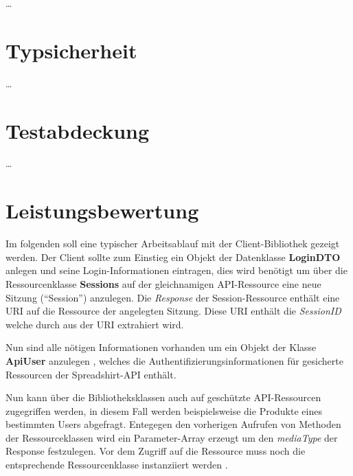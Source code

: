\ldots

\section{Typsicherheit}
\label{sec:type_safety}

\ldots

\section{Testabdeckung}
\label{sec:test_coverage}

\ldots

\section{Leistungsbewertung}
\label{sec:performance_measurement}


Im folgenden soll eine typischer Arbeitsablauf mit der Client-Bibliothek gezeigt werden. Der Client sollte zum Einstieg ein Objekt der Datenklasse \textbf{LoginDTO} anlegen  und seine Login-Informationen eintragen, dies wird benötigt um über die Ressourcenklasse \textbf{Sessions} auf der gleichnamigen \gls{API}-Ressource eine neue Sitzung (\enquote{Session}) anzulegen.
Die \emph{Response} der Session-Ressource enthält eine \gls{URI} auf die Ressource der angelegten Sitzung. Diese \gls{URI} enthält die \emph{SessionID} welche durch  aus der \gls{URI} extrahiert wird.

Nun sind alle nötigen Informationen vorhanden um ein Objekt der Klasse \textbf{ApiUser} anzulegen , welches die Authentifizierungsinformationen für gesicherte Ressourcen der Spreadshirt-\gls{API} enthält.

Nun kann über die Bibliotheksklassen auch auf geschützte \gls{API}-Ressourcen zugegriffen werden, in diesem Fall werden beispielsweise die Produkte eines bestimmten Users abgefragt. Entegegen den vorherigen Aufrufen von Methoden der Ressourceklassen wird ein Parameter-Array erzeugt  um den \emph{mediaType} der Response festzulegen.
Vor dem Zugriff auf die Ressource muss noch die entsprechende Ressourcenklasse instanziiert werden .

